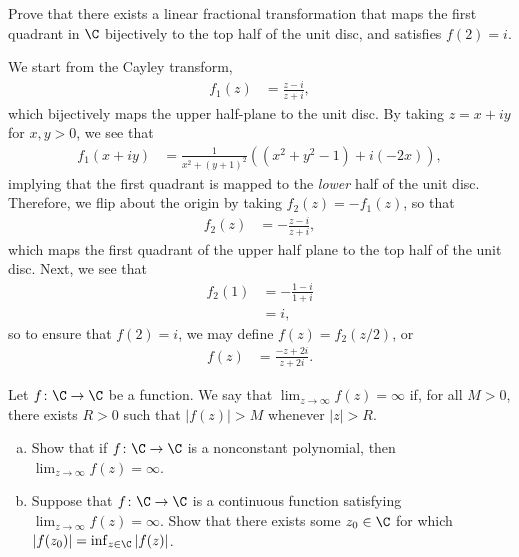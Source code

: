 \documentclass[11pt]{mypackage}
\begin{document}
\begin{problem}[Problem 3]
  Prove that there exists a linear fractional transformation that maps the first quadrant in $\C$ bijectively to the top half of the unit disc, and satisfies $f(2) = i$.
\end{problem}
\begin{solution}
  We start from the Cayley transform,
  \begin{align*}
    f_1(z) &= \frac{z-i}{z+i},
  \end{align*}
  which bijectively maps the upper half-plane to the unit disc. By taking $z = x + iy$ for $ x,y > 0$, we see that
  \begin{align*}
    f_1\left( x+iy \right) &= \frac{1}{x^2 + \left( y+1 \right)^2}\left( \left( x^2 + y^2 - 1 \right) + i\left( -2x \right) \right),
  \end{align*}
  implying that the first quadrant is mapped to the \textit{lower} half of the unit disc. Therefore, we flip about the origin by taking $f_2(z) = -f_1(z)$, so that
  \begin{align*}
    f_2(z) &= -\frac{z-i}{z+i},
  \end{align*}
  which maps the first quadrant of the upper half plane to the top half of the unit disc. Next, we see that
  \begin{align*}
    f_2(1) &= -\frac{1-i}{1+i}\\
           &= i,
  \end{align*}
  so to ensure that $f(2) = i$, we may define $f(z) = f_2(z/2)$, or
  \begin{align*}
    f(z) &= \frac{-z+2i}{z+2i}.
  \end{align*}
\end{solution}
\begin{problem}[Problem 4]
  Let $f\colon \C\rightarrow \C$ be a function. We say that $\lim_{z\rightarrow\infty}f(z) = \infty$ if, for all $M > 0$, there exists $R > 0$ such that $\left\vert f(z)  \right\vert > M$ whenever $\left\vert z \right\vert > R$.
  \begin{enumerate}[(a)]
    \item Show that if $f\colon \C\rightarrow \C$ is a nonconstant polynomial, then $\lim_{z\rightarrow\infty}f(z) = \infty$.
    \item Suppose that $f\colon \C\rightarrow \C$ is a continuous function satisfying $\lim_{z\rightarrow\infty}f(z) = \infty$. Show that there exists some $z_0\in \C$ for which $\left\vert f(z_0) \right\vert = \inf_{z\in \C} \left\vert f(z) \right\vert$.
  \end{enumerate}
\end{problem}
\end{document}
